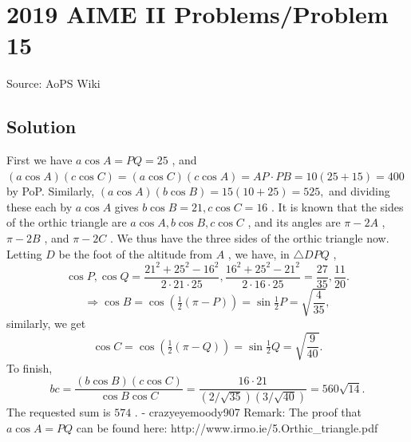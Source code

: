 \documentclass[12pt]{article}
\begin{document}
\section*{{2019 AIME II Problems/Problem 15}}
Source: AoPS Wiki

\subsection*{Solution}
First we have $a\cos A=PQ=25$ , and $(a\cos A)(c\cos C)=(a\cos C)(c\cos A)=AP\cdot PB=10(25+15)=400$ by PoP. Similarly, $(a\cos A)(b\cos B)=15(10+25)=525,$ and dividing these each by $a\cos A$ gives $b\cos B=21,c\cos C=16$ . It is known that the sides of the orthic triangle are $a\cos A,b\cos B,c\cos C$ , and its angles are $\pi-2A$ , $\pi-2B$ , and $\pi-2C$ . We thus have the three sides of the orthic triangle now.
Letting $D$ be the foot of the altitude from $A$ , we have, in $\triangle DPQ$ , \[\cos P,\cos Q=\frac{21^2+25^2-16^2}{2\cdot 21\cdot 25},\frac{16^2+25^2-21^2}{2\cdot 16\cdot 25}= \frac{27}{35}, \frac{11}{20}.\] \[\Rightarrow \cos B=\cos\left(\tfrac 12 (\pi-P)\right)=\sin\tfrac 12 P =\sqrt{\frac{4}{35}},\] similarly, we get \[\cos C=\cos\left(\tfrac 12 (\pi-Q)\right)=\sin\tfrac 12 Q=\sqrt{\frac{9}{40}}.\] To finish, \[bc= \frac{(b\cos B)(c\cos C)}{\cos B\cos C}=\frac{16\cdot 21}{(2/\sqrt{35})(3/\sqrt{40})}=560\sqrt{14}.\] The requested sum is $\boxed{574}$ .
- crazyeyemoody907 Remark: The proof that $a \cos A = PQ$ can be found here: http://www.irmo.ie/5.Orthic_triangle.pdf
\end{document}
